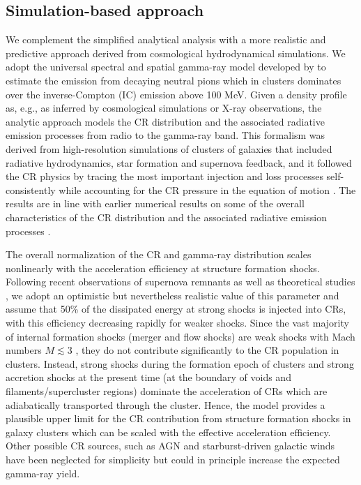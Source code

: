 \documentclass[12pt,manuscript]{aastex}
\begin{document}
\subsection{Simulation-based approach}
\label{sec:simulation}
We complement the simplified analytical analysis with a more realistic and predictive approach
derived from cosmological hydrodynamical simulations. We adopt the universal spectral and spatial
gamma-ray model developed by \citet{article:PinzkePfrommer:2010} to estimate the emission from
decaying neutral pions which in clusters dominates over the inverse-Compton (IC) emission above
100 MeV. Given a density profile as, e.g., as inferred by
cosmological simulations or X-ray observations, the analytic approach models the CR distribution and
the associated radiative emission processes from radio to the gamma-ray band. This formalism was
derived from high-resolution simulations of clusters of galaxies that included radiative
hydrodynamics, star formation and supernova feedback, and it followed the CR physics by tracing the
most important injection and loss processes self-consistently while accounting for the CR pressure
in the equation of motion
\citep{article:PfrommerSpringelEnsslinJubelgas, article:EnsslinPfrommerSpringelJubelgas:2007,
article:JubelgasSpringelEnsslinPfrommer:2008}. The results are in line with earlier numerical
results on some of the overall characteristics of the CR distribution and the associated radiative
emission processes \citep{article:DolagEnsslin:2000, article:MiniatiRyuKangJones:2001,
article:Miniati:2003, article:Pfrommer_etal:2007, article:PfrommerEnsslinSpringel:2008,
article:Pfrommer:2008}.
 
The overall normalization of the CR and gamma-ray distribution scales nonlinearly with the
acceleration efficiency at structure formation shocks. Following recent observations of supernova
remnants \citep{article:Helder_etal:2009} as well as theoretical studies
\citep{article:KangJones:2005}, we adopt an optimistic but nevertheless realistic value of this
parameter and assume that 50\% of the dissipated energy at strong shocks is injected into CRs, with
this efficiency decreasing rapidly for weaker shocks. Since the vast majority of internal formation
shocks (merger and flow shocks) are weak shocks with Mach numbers $M\lesssim3$
\citep[e.g.,][]{article:Ryu_etal:2003}, they do not contribute significantly to the CR population in
clusters. Instead, strong shocks during the formation epoch of clusters and strong accretion shocks
at the present time (at the boundary of voids and filaments/supercluster regions) dominate the
acceleration of CRs which are adiabatically transported through the cluster. Hence, the
model provides a plausible upper limit for the CR contribution from structure formation shocks in
galaxy clusters which can be scaled with the effective acceleration efficiency. Other possible CR
sources, such as AGN and starburst-driven galactic winds have been neglected for simplicity but
could in principle increase the expected gamma-ray yield.
\end{document}
